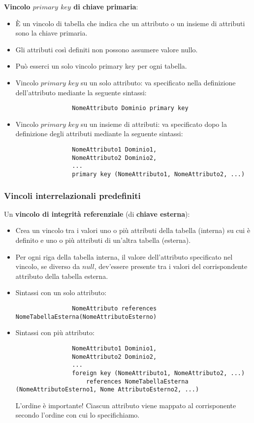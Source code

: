 \textbf{Vincolo $primary$ $key$ di chiave primaria}:
    \begin{itemize}
        \item{È un vincolo di tabella che indica che un attributo o un insieme di attributi sono la chiave primaria.}
        \item{Gli attributi così definiti non possono assumere valore nullo.}
        \item{Può esserci un solo vincolo primary key per ogni tabella.}
        \item{Vincolo $primary$ $key$ su un solo attributo: va specificato nella definizione dell'attributo mediante la seguente sintassi:
            \begin{lstlisting}
                NomeAttributo Dominio primary key
            \end{lstlisting}}
        \item{Vincolo $primary$ $key$ su un insieme di attributi: va specificato dopo la definizione degli attributi mediante la seguente sintassi:
            \begin{lstlisting}
                NomeAttributo1 Dominio1,
                NomeAttributo2 Dominio2,
                ...
                primary key (NomeAttributo1, NomeAttributo2, ...)
            \end{lstlisting}}
    \end{itemize}

\subsubsection{Vincoli interrelazionali predefiniti}
Un \textbf{vincolo di integrità referenziale} (di \textbf{chiave esterna}):
    \begin{itemize}
        \item{Crea un vincolo tra i valori uno o più attributi della tabella (interna) su cui è definito e uno o più attributi di un'altra tabella (esterna).}
        \item{Per ogni riga della tabella interna, il valore dell'attributo specificato nel vincolo, se diverso da $null$, dev'essere presente tra i valori del corrispondente attributo della tabella esterna.}
        \item{Sintassi con un solo attributo:
            \begin{lstlisting}
                NomeAttributo references NomeTabellaEsterna(NomeAttributoEsterno)
            \end{lstlisting}}
        \item{Sintassi con più attributo:
            \begin{lstlisting}
                NomeAttributo1 Dominio1,
                NomeAttributo2 Dominio2,
                ...
                foreign key (NomeAttributo1, NomeAttributo2, ...)
                    references NomeTabellaEsterna (NomeAttributoEsterno1, Nome AttributoEsterno2, ...)
            \end{lstlisting}
            L'ordine è importante! Ciascun attributo viene mappato al corrisponente secondo l'ordine con cui lo specifichiamo.}
    \end{itemize}

